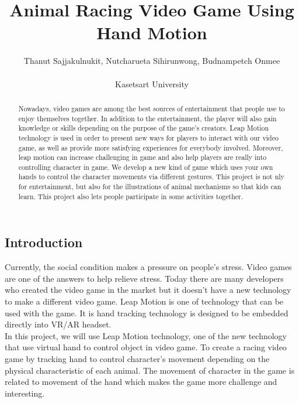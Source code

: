 \documentclass[12pt, oneside]{article}										%
\title{\textbf{Animal Racing Video Game Using Hand Motion}}
\author{Thanut Sajjakulnukit, Nutcharueta Sihirunwong, Budnampetch Onmee \\ \\
    \Large Kasetsart University }
\begin{document}
    \maketitle														        %
    \begin{multicols*}{2}
    \twocolumn
    \begin{abstract}                                                        %
        Nowadays, video games are among the best sources of 
        entertainment that people use to enjoy themselves together.
        In addition to the entertainment, the player will also gain 
        knowledge or skills depending on the purpose of the game’s 
        creators. Leap Motion technology is used in order to 
        present new ways for players to interact with our video 
        game, as well as provide more satisfying experiences for 
        everybody involved. Moreover, leap motion can increase 
        challenging in game and also help players are really into 
        controlling character in game. We  develop a new kind of 
        game which uses your own hands to control the character 
        movements via different gestures. This project is not 
        nly for entertainment, but also for the illustrations 
        of animal mechanisms so that kids can learn. This 
        project also lets people participate in some 
        activities together.

    \end{abstract}

    \section{Introduction}                                                  %
    Currently, the social condition makes a pressure on people’s 
    stress. Video games are one of the answers to help relieve 
    stress. Today there are many developers who created the video 
    game in the market but it doesn't have a new technology to make 
    a different video game. Leap Motion is one of technology that 
    can be used with the game. It is hand tracking technology is 
    designed to be embedded directly into VR/AR headset. \\

    In this project, we will use Leap Motion technology, one of
    the new technology that use virtual hand to control object
    in video game. To create a racing video game by tracking 
    hand to control character’s movement depending on the 
    physical characteristic of each animal. The movement of 
    character in the game is related to movement of the hand 
    which makes the game more challenge and interesting.
    

\end{multicols*}
\end{document}
